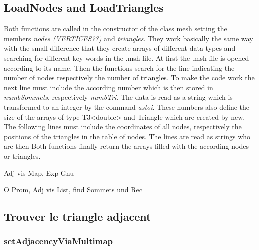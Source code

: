 \documentclass[10pt]{article}
\begin{document}
\subsection{LoadNodes and LoadTriangles} \label{Load}
Both functions are called in the constructor of the class mesh setting the members {\itshape nodes (VERTICES??)} and {\itshape triangles}. 
They work basically the same way with the small difference that they create arrays of different data types and searching for different key words in the .msh file. 
At first the .msh file is opened according to its name. Then the functions search for the line indicating the number of nodes respectively the number of triangles. 
To make the code work the next line must include the according number which is then stored in {\itshape numbSommets}, respectively {\itshape numbTri}. The data is read as a string which is transformed to an integer by the command {\itshape astoi}. These numbers also define the size of the arrays of type T3<double> and Triangle which are created by new. The following lines must include the coordinates of all nodes, respectively the positions of the triangles in the table of nodes. The lines are read as strings who are then 
Both functions finally return the arrays filled with the according nodes or triangles. 


\newpage

Adj vis Map, Exp Gnu

O Prom, Adj vis List, find Sommets und Rec



\subsection{Trouver le triangle adjacent}

\subsubsection{setAdjacencyViaMultimap} \label{multimap}
\end{document}
